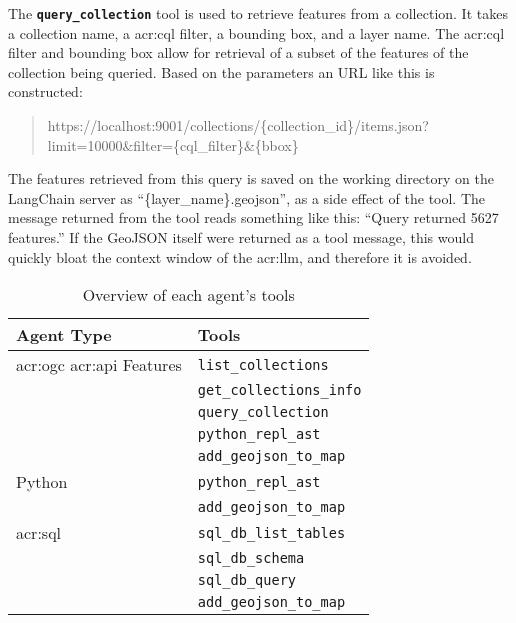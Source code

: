 The \textbf{\texttt{query\_collection}} tool is used to retrieve features from a collection. It takes a collection name, a \acrshort{acr:cql} filter, a bounding box, and a layer name. The \acrshort{acr:cql} filter and bounding box allow for retrieval of a subset of the features of the collection being queried. Based on the parameters an URL like this is constructed:

\begin{quote}
    https://localhost:9001/collections/\{collection\_id\}/items.json?limit=10000\&filter=\{cql\_filter\}\&\{bbox\}
\end{quote}

The features retrieved from this query is saved on the working directory on the LangChain server as \enquote{\{layer\_name\}.geojson}, as a side effect of the tool. The message returned from the tool reads something like this: \enquote{Query returned 5627 features.} If the GeoJSON itself were returned as a tool message, this would quickly bloat the context window of the \acrshort{acr:llm}, and therefore it is avoided.

\begin{table}[h]
    \centering
    \caption{Overview of each agent's tools}
    \label{tbl:agent-tool-overview}
    \begin{tabularx}{0.7\textwidth}{XX}
        \toprule
        \textbf{Agent Type}                            & \textbf{Tools}                  \\
        \midrule
        \acrshort{acr:ogc} \acrshort{acr:api} Features & \texttt{list\_collections}      \\
                                                       & \texttt{get\_collections\_info} \\
                                                       & \texttt{query\_collection}      \\
                                                       & \texttt{python\_repl\_ast}      \\
                                                       & \texttt{add\_geojson\_to\_map}  \\
        \midrule
        Python                                         & \texttt{python\_repl\_ast}      \\
                                                       & \texttt{add\_geojson\_to\_map}  \\
        \midrule
        \acrshort{acr:sql}                             & \texttt{sql\_db\_list\_tables}  \\
                                                       & \texttt{sql\_db\_schema}        \\
                                                       & \texttt{sql\_db\_query}         \\
                                                       & \texttt{add\_geojson\_to\_map}  \\
        \bottomrule
    \end{tabularx}
\end{table}

